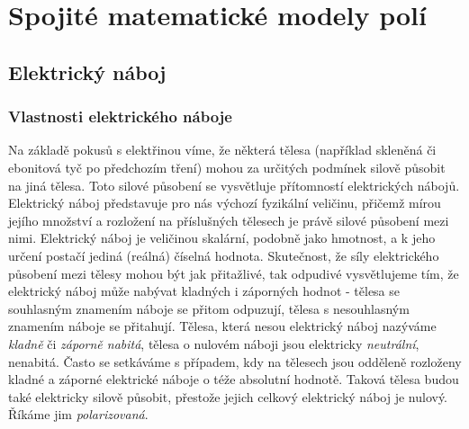 \chapter{Spojité matematické modely polí}
\minitoc
\newpage
  \section{Elektrický náboj}
    \subsection{Vlastnosti elektrického náboje}
      Na základě pokusů s elektřinou víme, že některá tělesa (například skleněná či ebonitová tyč
      po předchozím tření) mohou za určitých podmínek silově působit na jiná tělesa. Toto silové
      působení se vysvětluje přítomností elektrických nábojů. Elektrický náboj představuje pro nás
      výchozí fyzikální veličinu, přičemž mírou jejího množství a rozložení na příslušných tělesech
      je právě silové působení mezi nimi. Elektrický náboj je veličinou skalární, podobně jako
      hmotnost, a k jeho určení postačí jediná (reálná) číselná hodnota. Skutečnost, že síly
      elektrického působení mezi tělesy mohou být jak přitažlivé, tak odpudivé vysvětlujeme tím, že
      elektrický náboj může nabývat kladných i záporných hodnot - tělesa se souhlasným znamením
      náboje se přitom odpuzují, tělesa s nesouhlasným znamením náboje se přitahují. Tělesa, která
      nesou elektrický náboj nazýváme \emph{kladně} či \emph{záporně nabitá}, tělesa o nulovém
      náboji jsou elektricky \emph{neutrální}, nenabitá. Často se setkáváme s případem, kdy na
      tělesech jsou odděleně rozloženy kladné a záporné elektrické náboje o téže absolutní hodnotě.
      Taková tělesa budou také elektricky silově působit, přestože jejich celkový elektrický náboj
      je nulový. Říkáme jim \emph{polarizovaná}.
      
